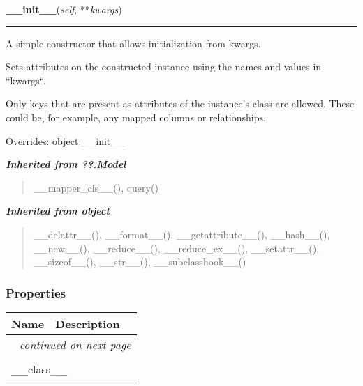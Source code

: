     \vspace{0.5ex}

\hspace{.8\funcindent}\begin{boxedminipage}{\funcwidth}

    \raggedright \textbf{\_\_init\_\_}(\textit{self}, **\textit{kwargs})

    \vspace{-1.5ex}

    \rule{\textwidth}{0.5\fboxrule}
\setlength{\parskip}{2ex}
    A simple constructor that allows initialization from kwargs.

    Sets attributes on the constructed instance using the names and values 
    in ``kwargs``.

    Only keys that are present as attributes of the instance's class are 
    allowed. These could be, for example, any mapped columns or 
    relationships.

\setlength{\parskip}{1ex}
      Overrides: object.\_\_init\_\_

    \end{boxedminipage}


\large{\textbf{\textit{Inherited from ??.Model}}}

\begin{quote}
\_\_mapper\_cls\_\_(), query()
\end{quote}

\large{\textbf{\textit{Inherited from object}}}

\begin{quote}
\_\_delattr\_\_(), \_\_format\_\_(), \_\_getattribute\_\_(), \_\_hash\_\_(), \_\_new\_\_(), \_\_reduce\_\_(), \_\_reduce\_ex\_\_(), \_\_setattr\_\_(), \_\_sizeof\_\_(), \_\_str\_\_(), \_\_subclasshook\_\_()
\end{quote}


  \subsubsection{Properties}

    \vspace{-1cm}
\hspace{\varindent}\begin{longtable}{|p{\varnamewidth}|p{\vardescrwidth}|l}
\cline{1-2}
\cline{1-2} \centering \textbf{Name} & \centering \textbf{Description}& \\
\cline{1-2}
\endhead\cline{1-2}\multicolumn{3}{r}{\small\textit{continued on next page}}\\\endfoot\cline{1-2}
\endlastfoot\multicolumn{2}{|l|}{\textit{Inherited from object}}\\
\multicolumn{2}{|p{\varwidth}|}{\raggedright \_\_class\_\_}\\
\cline{1-2}
\end{longtable}


